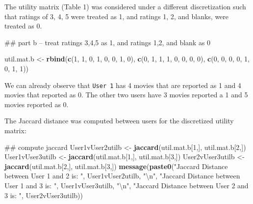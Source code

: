 \documentclass[]{article}
\newenvironment{Shaded}{\begin{snugshade}}{\end{snugshade}}
\newcommand{\KeywordTok}[1]{\textcolor[rgb]{0.13,0.29,0.53}{\textbf{{#1}}}}
\newcommand{\DecValTok}[1]{\textcolor[rgb]{0.00,0.00,0.81}{{#1}}}
\newcommand{\CharTok}[1]{\textcolor[rgb]{0.31,0.60,0.02}{{#1}}}
\newcommand{\StringTok}[1]{\textcolor[rgb]{0.31,0.60,0.02}{{#1}}}
\newcommand{\NormalTok}[1]{{#1}}
\begin{document}
The utility matrix (Table 1) was considered under a different
discretization such that ratings of 3, 4, 5 were treated as 1, and
ratings 1, 2, and blanks, were treated as 0.

\begin{Shaded}
\begin{Highlighting}[]
\NormalTok{## part b -- treat ratings 3,4,5 as 1, and ratings 1,2, and blank as 0}

\NormalTok{util.mat.b <-}\StringTok{ }\KeywordTok{rbind}\NormalTok{(}\KeywordTok{c}\NormalTok{(}\DecValTok{1}\NormalTok{, }\DecValTok{1}\NormalTok{, }\DecValTok{0}\NormalTok{, }\DecValTok{1}\NormalTok{, }\DecValTok{0}\NormalTok{, }\DecValTok{0}\NormalTok{, }\DecValTok{1}\NormalTok{, }\DecValTok{0}\NormalTok{),}
                    \KeywordTok{c}\NormalTok{(}\DecValTok{0}\NormalTok{, }\DecValTok{1}\NormalTok{, }\DecValTok{1}\NormalTok{, }\DecValTok{1}\NormalTok{, }\DecValTok{0}\NormalTok{, }\DecValTok{0}\NormalTok{, }\DecValTok{0}\NormalTok{, }\DecValTok{0}\NormalTok{),}
                    \KeywordTok{c}\NormalTok{(}\DecValTok{0}\NormalTok{, }\DecValTok{0}\NormalTok{, }\DecValTok{0}\NormalTok{, }\DecValTok{0}\NormalTok{, }\DecValTok{1}\NormalTok{, }\DecValTok{0}\NormalTok{, }\DecValTok{1}\NormalTok{, }\DecValTok{1}\NormalTok{))}
\end{Highlighting}
\end{Shaded}

We can already observe that \texttt{User 1} has 4 movies that are
reported as 1 and 4 movies that reported as 0. The other two users have
3 movies reported a 1 and 5 movies reported as 0.

The Jaccard distance was computed between users for the discretized
utility matrix:

\begin{Shaded}
\begin{Highlighting}[]
\NormalTok{## compute jaccard }
\NormalTok{User1vUser2utilb <-}\StringTok{ }\KeywordTok{jaccard}\NormalTok{(util.mat.b[}\DecValTok{1}\NormalTok{,], util.mat.b[}\DecValTok{2}\NormalTok{,])}
\NormalTok{User1vUser3utilb <-}\StringTok{ }\KeywordTok{jaccard}\NormalTok{(util.mat.b[}\DecValTok{1}\NormalTok{,], util.mat.b[}\DecValTok{3}\NormalTok{,])}
\NormalTok{User2vUser3utilb <-}\StringTok{ }\KeywordTok{jaccard}\NormalTok{(util.mat.b[}\DecValTok{2}\NormalTok{,], util.mat.b[}\DecValTok{3}\NormalTok{,])}
\KeywordTok{message}\NormalTok{(}\KeywordTok{paste0}\NormalTok{(}\StringTok{"Jaccard Distance between User 1 and 2 is: "}\NormalTok{, User1vUser2utilb, }\StringTok{"}\CharTok{\textbackslash{}n}\StringTok{"}\NormalTok{,}
               \StringTok{"Jaccard Distance between User 1 and 3 is: "}\NormalTok{, User1vUser3utilb, }\StringTok{"}\CharTok{\textbackslash{}n}\StringTok{"}\NormalTok{,}
               \StringTok{"Jaccard Distance between User 2 and 3 is: "}\NormalTok{, User2vUser3utilb))}
\end{Highlighting}
\end{Shaded}
\end{document}
